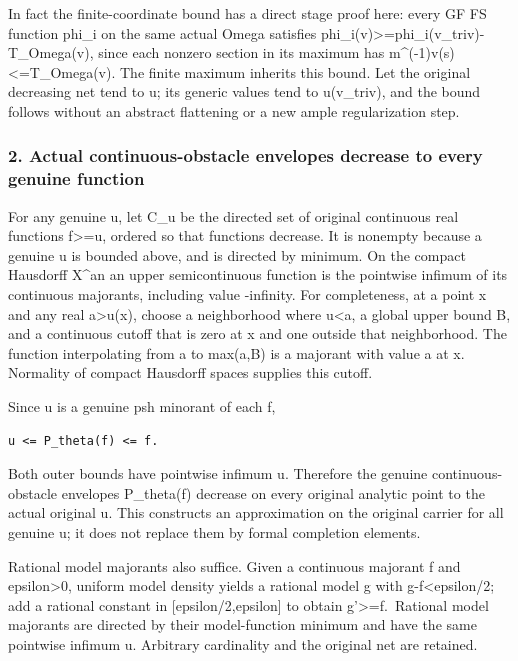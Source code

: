 \documentclass[
  10pt,
]{article}
\begin{document}
In fact the finite-coordinate bound has a direct stage proof here: every
GF FS function phi\_i on the same actual Omega satisfies
phi\_i(v)\textgreater=phi\_i(v\_triv)-T\_Omega(v), since each nonzero
section in its maximum has m\^{}(-1)v(s)\textless=T\_Omega(v). The
finite maximum inherits this bound. Let the original decreasing net tend
to u; its generic values tend to u(v\_triv), and the bound follows
without an abstract flattening or a new ample regularization step.

\subsubsection{2. Actual continuous-obstacle envelopes decrease to every
genuine
function}\label{actual-continuous-obstacle-envelopes-decrease-to-every-genuine-function}

For any genuine u, let C\_u be the directed set of original continuous
real functions f\textgreater=u, ordered so that functions decrease. It
is nonempty because a genuine u is bounded above, and is directed by
minimum. On the compact Hausdorff X\^{}an an upper semicontinuous
function is the pointwise infimum of its continuous majorants, including
value -infinity. For completeness, at a point x and any real
a\textgreater u(x), choose a neighborhood where u\textless a, a global
upper bound B, and a continuous cutoff that is zero at x and one outside
that neighborhood. The function interpolating from a to max(a,B) is a
majorant with value a at x. Normality of compact Hausdorff spaces
supplies this cutoff.

Since u is a genuine psh minorant of each f,

\begin{verbatim}
u <= P_theta(f) <= f.
\end{verbatim}

Both outer bounds have pointwise infimum u. Therefore the genuine
continuous-obstacle envelopes P\_theta(f) decrease on every original
analytic point to the actual original u. This constructs an
approximation on the original carrier for all genuine u; it does not
replace them by formal completion elements.

Rational model majorants also suffice. Given a continuous majorant f and
epsilon\textgreater0, uniform model density yields a rational model g
with \textbar\textbar g-f\textbar\textbar\textless epsilon/2; add a
rational constant in {[}epsilon/2,epsilon{]} to obtain
g'\textgreater=f.~Rational model majorants are directed by their
model-function minimum and have the same pointwise infimum u. Arbitrary
cardinality and the original net are retained.
\end{document}
